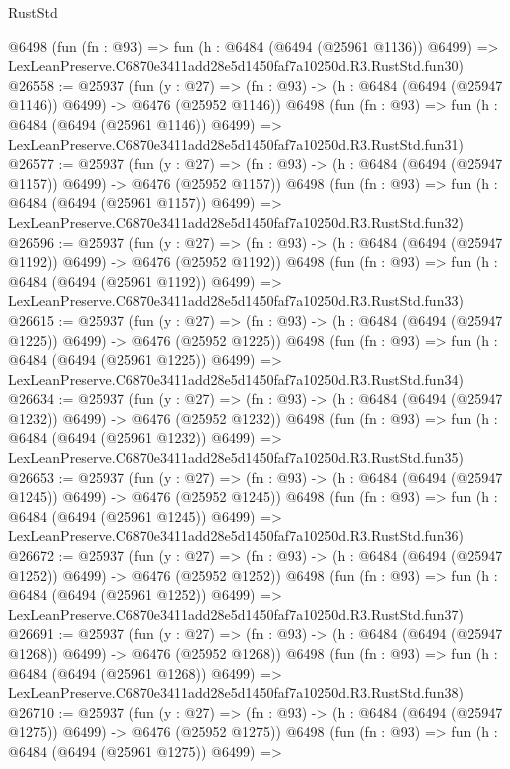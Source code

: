 \begin{lexlean}{RustStd}
\begin{coremodule}
    @6498
    (fun (fn : @93) =>
    fun (h : @6484 (@6494 (@25961 @1136)) @6499) =>
    LexLeanPreserve.C6870e3411add28e5d1450faf7a10250d.R3.RustStd.fun30)
@26558 := @25937
    (fun (y : @27) =>
    (fn : @93) -> (h : @6484 (@6494 (@25947 @1146)) @6499) -> @6476 (@25952 @1146))
    @6498
    (fun (fn : @93) =>
    fun (h : @6484 (@6494 (@25961 @1146)) @6499) =>
    LexLeanPreserve.C6870e3411add28e5d1450faf7a10250d.R3.RustStd.fun31)
@26577 := @25937
    (fun (y : @27) =>
    (fn : @93) -> (h : @6484 (@6494 (@25947 @1157)) @6499) -> @6476 (@25952 @1157))
    @6498
    (fun (fn : @93) =>
    fun (h : @6484 (@6494 (@25961 @1157)) @6499) =>
    LexLeanPreserve.C6870e3411add28e5d1450faf7a10250d.R3.RustStd.fun32)
@26596 := @25937
    (fun (y : @27) =>
    (fn : @93) -> (h : @6484 (@6494 (@25947 @1192)) @6499) -> @6476 (@25952 @1192))
    @6498
    (fun (fn : @93) =>
    fun (h : @6484 (@6494 (@25961 @1192)) @6499) =>
    LexLeanPreserve.C6870e3411add28e5d1450faf7a10250d.R3.RustStd.fun33)
@26615 := @25937
    (fun (y : @27) =>
    (fn : @93) -> (h : @6484 (@6494 (@25947 @1225)) @6499) -> @6476 (@25952 @1225))
    @6498
    (fun (fn : @93) =>
    fun (h : @6484 (@6494 (@25961 @1225)) @6499) =>
    LexLeanPreserve.C6870e3411add28e5d1450faf7a10250d.R3.RustStd.fun34)
@26634 := @25937
    (fun (y : @27) =>
    (fn : @93) -> (h : @6484 (@6494 (@25947 @1232)) @6499) -> @6476 (@25952 @1232))
    @6498
    (fun (fn : @93) =>
    fun (h : @6484 (@6494 (@25961 @1232)) @6499) =>
    LexLeanPreserve.C6870e3411add28e5d1450faf7a10250d.R3.RustStd.fun35)
@26653 := @25937
    (fun (y : @27) =>
    (fn : @93) -> (h : @6484 (@6494 (@25947 @1245)) @6499) -> @6476 (@25952 @1245))
    @6498
    (fun (fn : @93) =>
    fun (h : @6484 (@6494 (@25961 @1245)) @6499) =>
    LexLeanPreserve.C6870e3411add28e5d1450faf7a10250d.R3.RustStd.fun36)
@26672 := @25937
    (fun (y : @27) =>
    (fn : @93) -> (h : @6484 (@6494 (@25947 @1252)) @6499) -> @6476 (@25952 @1252))
    @6498
    (fun (fn : @93) =>
    fun (h : @6484 (@6494 (@25961 @1252)) @6499) =>
    LexLeanPreserve.C6870e3411add28e5d1450faf7a10250d.R3.RustStd.fun37)
@26691 := @25937
    (fun (y : @27) =>
    (fn : @93) -> (h : @6484 (@6494 (@25947 @1268)) @6499) -> @6476 (@25952 @1268))
    @6498
    (fun (fn : @93) =>
    fun (h : @6484 (@6494 (@25961 @1268)) @6499) =>
    LexLeanPreserve.C6870e3411add28e5d1450faf7a10250d.R3.RustStd.fun38)
@26710 := @25937
    (fun (y : @27) =>
    (fn : @93) -> (h : @6484 (@6494 (@25947 @1275)) @6499) -> @6476 (@25952 @1275))
    @6498
    (fun (fn : @93) =>
    fun (h : @6484 (@6494 (@25961 @1275)) @6499) =>

\end{coremodule}
\end{lexlean}
